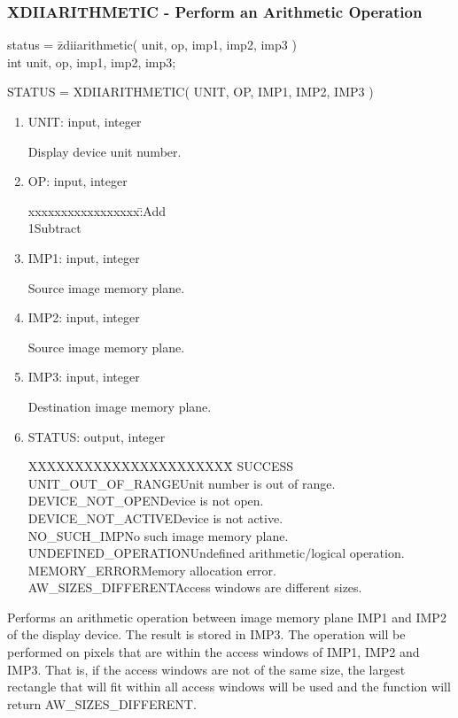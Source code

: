 \subsubsection{XDIIARITHMETIC - Perform an Arithmetic Operation}
\begin{tabbing}
status = \=zdiiarithmetic( unit, op, imp1, imp2, imp3 )\\
\>int  unit, op, imp1, imp2, imp3;\\
\end{tabbing}
STATUS = XDIIARITHMETIC( UNIT, OP, IMP1, IMP2, IMP3 )
\begin{enumerate}
\item UNIT:  input, integer

Display device unit number.
\item OP:  input, integer
\begin{tabbing}
xxxxxxxxxxxxxxxxx:\=\>Add\\
1\>Subtract\\
\end{tabbing}
\item IMP1:  input, integer

Source image memory plane.
\item IMP2:  input, integer

Source image memory plane.
\item IMP3:  input, integer

Destination image memory plane.
\item STATUS:  output, integer
\begin{tabbing}
XXXXXXXXXXXXXXXXXXXXXX\=\kill
SUCCESS\\
UNIT\_OUT\_OF\_RANGE\>Unit number is out of range.\\
DEVICE\_NOT\_OPEN\>Device is not open.\\
DEVICE\_NOT\_ACTIVE\>Device is not active.\\
NO\_SUCH\_IMP\>No such image memory plane.\\
UNDEFINED\_OPERATION\>Undefined arithmetic/logical operation.\\
MEMORY\_ERROR\>Memory allocation error.\\
AW\_SIZES\_DIFFERENT\>Access windows are different sizes.\\
\end{tabbing}
\end{enumerate}
Performs an arithmetic operation between image memory plane IMP1
and IMP2 of the display device.  The result is stored in IMP3.  The
operation will be performed on pixels that are within the access
windows of IMP1, IMP2 and IMP3.  That is, if the access windows are
not of the same size, the largest rectangle that will fit within all
access windows will be used and the function will return AW\_SIZES\_DIFFERENT.
\newpage
